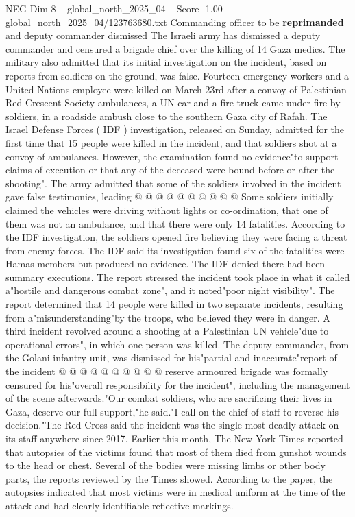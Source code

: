 \begin{textsample}{NEG Dim 8 – global\_north\_2025\_04 – Score -1.00 – global\_north\_2025\_04/123763680.txt}  \label{ex:f8_neg_426}
Commanding officer to be \textbf{reprimanded} and deputy commander dismissed The Israeli army has dismissed a deputy commander and censured a brigade chief over the killing of 14 Gaza medics.
The military also admitted that its initial investigation on the incident, based on reports from soldiers on the ground, was false.
Fourteen emergency workers and a United Nations employee were killed on March 23rd after a convoy of Palestinian Red Crescent Society ambulances, a UN car and a fire truck came under fire by soldiers, in a roadside ambush close to the southern Gaza city of Rafah.
The Israel Defense Forces ( IDF ) investigation, released on Sunday, admitted for the first time that 15 people were killed in the incident, and that soldiers shot at a convoy of ambulances.
However, the examination found no evidence"to support claims of execution or that any of the deceased were bound before or after the shooting".
The army admitted that some of the soldiers involved in the incident gave false testimonies, leading @ @ @ @ @ @ @ @ @ @ Some soldiers initially claimed the vehicles were driving without lights or co-ordination, that one of them was not an ambulance, and that there were only 14 fatalities.
According to the IDF investigation, the soldiers opened fire believing they were facing a threat from enemy forces.
The IDF said its investigation found six of the fatalities were Hamas members but produced no evidence.
The IDF denied there had been summary executions.
The report stressed the incident took place in what it called a"hostile and dangerous combat zone", and it noted"poor night visibility".
The report determined that 14 people were killed in two separate incidents, resulting from a"misunderstanding"by the troops, who believed they were in danger.
A third incident revolved around a shooting at a Palestinian UN vehicle"due to operational errors", in which one person was killed.
The deputy commander, from the Golani infantry unit, was dismissed for his"partial and inaccurate"report of the incident @ @ @ @ @ @ @ @ @ @ reserve armoured brigade was formally censured for his"overall responsibility for the incident", including the management of the scene afterwards."Our combat soldiers, who are sacrificing their lives in Gaza, deserve our full support,"he said."I call on the chief of staff to reverse his decision."The Red Cross said the incident was the single most deadly attack on its staff anywhere since 2017.
Earlier this month, The New York Times reported that autopsies of the victims found that most of them died from gunshot wounds to the head or chest.
Several of the bodies were missing limbs or other body parts, the reports reviewed by the Times showed.
According to the paper, the autopsies indicated that most victims were in medical uniform at the time of the attack and had clearly identifiable reflective markings.

\end{textsample}

